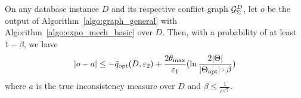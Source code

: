 \begin{theorem}\label{thm:graph_general_utility} On any database instance $D$ and its respective conflict graph ${\mathcal{G}_{{\Sigma}}^{D}}$, let $o$ be the output of Algorithm~\ref{algo:graph_general} with Algorithm~\ref{algo:expo_mech_basic} over $D$.  
Then,  with a probability of at least $1-\beta$, we have 
\begin{equation}
|o-a| \leq -\tilde{q}_{\normalfont{\text{opt}}}(D,\varepsilon_2) + \frac{2 \theta_{\max}}{\varepsilon_1} (\ln \frac{2|\Theta|}{|\Theta_{\normalfont{\text{opt}}}|\cdot \beta}) 
\end{equation}
where $a$ is the true inconsistency measure over $D$ and $\beta\leq \frac{1}{e^{\sqrt{2}}}$.
\end{theorem}


